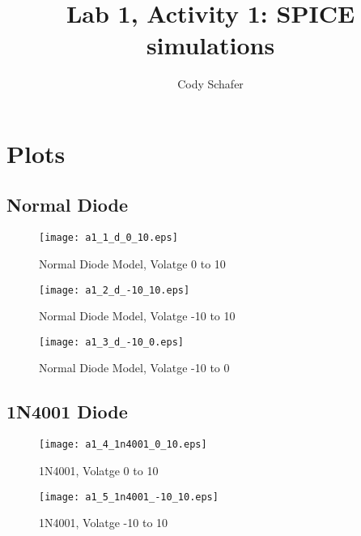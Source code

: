 \documentclass[10pt]{article}
\title{Lab 1, Activity 1: SPICE simulations}
\author{Cody Schafer}
\begin{document}
\section{Plots}

\subsection{Normal Diode}
	\begin{figure}[hb!]
		\centering
		\texttt{[image: a1\_1\_d\_0\_10.eps]}
		\caption{Normal Diode Model, Volatge 0 to 10}
		\label{fig:nd1}
	\end{figure}

	\begin{framed}
	
	\end{framed}

	\begin{figure}[hb!]
		\centering
		\texttt{[image: a1\_2\_d\_-10\_10.eps]}
		\caption{Normal Diode Model, Volatge -10 to 10}
		\label{fig:nd2}
	\end{figure}

	\begin{framed}
	
	\end{framed}

	\begin{figure}[hb!]
		\centering
		\texttt{[image: a1\_3\_d\_-10\_0.eps]}
		\caption{Normal Diode Model, Volatge -10 to 0}
		\label{fig:nd3}
	\end{figure}

	\begin{framed}
	
	\end{framed}
\subsection{1N4001 Diode}

	\begin{figure}[hb!]
		\centering
		\texttt{[image: a1\_4\_1n4001\_0\_10.eps]}
		\caption{1N4001, Volatge 0 to 10}
		\label{fig:1n1}
	\end{figure}
	\begin{framed}
	
	\end{framed}

	\begin{figure}[hb!]
		\centering
		\texttt{[image: a1\_5\_1n4001\_-10\_10.eps]}
		\caption{1N4001, Volatge -10 to 10}
		\label{fig:1n2}
	\end{figure}
	\begin{framed}
	
	\end{framed}
\end{document}
